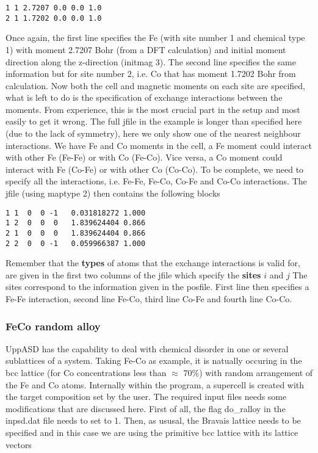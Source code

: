 \documentclass[11pt,fleqn,a4]{book} %
\begin{document}
\begin{fBox} 
\begin{Verbatim}
1 1 2.7207 0.0 0.0 1.0 
2 1 1.7202 0.0 0.0 1.0
\end{Verbatim}
\end{fBox}

Once again, the first line specifies the Fe (with site number 1 and chemical type 1) with moment 2.7207 Bohr (from a DFT calculation) and initial moment direction along the z-direction (initmag 3). The second line specifies the same information but for site number 2, i.e. Co that has moment 1.7202 Bohr from calculation. Now both the cell and magnetic moments on each site are specified, what is left to do is the specification of exchange interactions between the moments. From experience, this is the most crucial part in the setup and most easily to get it wrong. The full jfile in the example is longer than specified here (due to the lack of symmetry), here we only show one of the nearest neighbour interactions. We have Fe and Co moments in the cell, a Fe moment could interact with other Fe (Fe-Fe) or with Co (Fe-Co). Vice versa, a Co moment could interact with Fe (Co-Fe) or with other Co (Co-Co). To be complete, we need to specify all the interactions, i.e. Fe-Fe, Fe-Co, Co-Fe and Co-Co interactions. The jfile (using maptype 2) then contains the following blocks
\begin{fBox} 
\begin{Verbatim}
1 1  0  0 -1   0.031818272 1.000
1 2  0  0  0   1.839624404 0.866
2 1  0  0  0   1.839624404 0.866
2 2  0  0 -1   0.059966387 1.000
\end{Verbatim}
\end{fBox}
Remember that the \textbf{types} of atoms that the exchange interactions is valid for, are given in the first two columns of the jfile which specify the \textbf{sites} $i$ and $j$  The sites correspond to the information given in the posfile. First line then specifies a Fe-Fe interaction, second line Fe-Co, third line Co-Fe and fourth line Co-Co. 

\subsubsection{FeCo random alloy} 
UppASD has the capability to deal with chemical disorder in one or several sublattices of a system. Taking Fe-Co as example, it is natually occuring in the bcc lattice (for Co concentrations less  than $\approx $ 70\%)  with random arrangement of the Fe and Co atoms. Internally within the program, a supercell is created with the target composition set by the user. The required input files needs some modifications that are discussed here. First of all, the flag do_ralloy in the inpsd.dat file needs to set to 1. Then, as ususal, the Bravais lattice needs to be specified and in this case we are using the primitive bcc lattice with its lattice vectors
\end{document}
